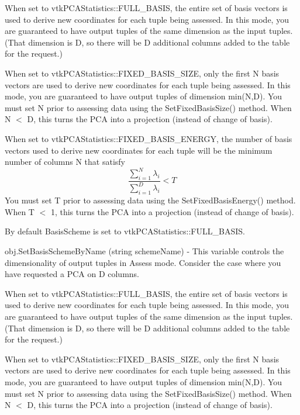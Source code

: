\begin{DoxyItemize}
When set to vtk\-P\-C\-A\-Statistics\-::\-F\-U\-L\-L\-\_\-\-B\-A\-S\-I\-S, the entire set of basis vectors is used to derive new coordinates for each tuple being assessed. In this mode, you are guaranteed to have output tuples of the same dimension as the input tuples. (That dimension is D, so there will be D additional columns added to the table for the request.)

When set to vtk\-P\-C\-A\-Statistics\-::\-F\-I\-X\-E\-D\-\_\-\-B\-A\-S\-I\-S\-\_\-\-S\-I\-Z\-E, only the first N basis vectors are used to derive new coordinates for each tuple being assessed. In this mode, you are guaranteed to have output tuples of dimension min(\-N,\-D). You must set N prior to assessing data using the Set\-Fixed\-Basis\-Size() method. When N $<$ D, this turns the P\-C\-A into a projection (instead of change of basis).

When set to vtk\-P\-C\-A\-Statistics\-::\-F\-I\-X\-E\-D\-\_\-\-B\-A\-S\-I\-S\-\_\-\-E\-N\-E\-R\-G\-Y, the number of basis vectors used to derive new coordinates for each tuple will be the minimum number of columns N that satisfy \[ \frac{\sum_{i=1}^{N} \lambda_i}{\sum_{i=1}^{D} \lambda_i} < T \] You must set T prior to assessing data using the Set\-Fixed\-Basis\-Energy() method. When T $<$ 1, this turns the P\-C\-A into a projection (instead of change of basis).

By default Basis\-Scheme is set to vtk\-P\-C\-A\-Statistics\-::\-F\-U\-L\-L\-\_\-\-B\-A\-S\-I\-S.  
\item {\ttfamily obj.\-Set\-Basis\-Scheme\-By\-Name (string scheme\-Name)} -\/ This variable controls the dimensionality of output tuples in Assess mode. Consider the case where you have requested a P\-C\-A on D columns.

When set to vtk\-P\-C\-A\-Statistics\-::\-F\-U\-L\-L\-\_\-\-B\-A\-S\-I\-S, the entire set of basis vectors is used to derive new coordinates for each tuple being assessed. In this mode, you are guaranteed to have output tuples of the same dimension as the input tuples. (That dimension is D, so there will be D additional columns added to the table for the request.)

When set to vtk\-P\-C\-A\-Statistics\-::\-F\-I\-X\-E\-D\-\_\-\-B\-A\-S\-I\-S\-\_\-\-S\-I\-Z\-E, only the first N basis vectors are used to derive new coordinates for each tuple being assessed. In this mode, you are guaranteed to have output tuples of dimension min(\-N,\-D). You must set N prior to assessing data using the Set\-Fixed\-Basis\-Size() method. When N $<$ D, this turns the P\-C\-A into a projection (instead of change of basis).


\end{DoxyItemize}
